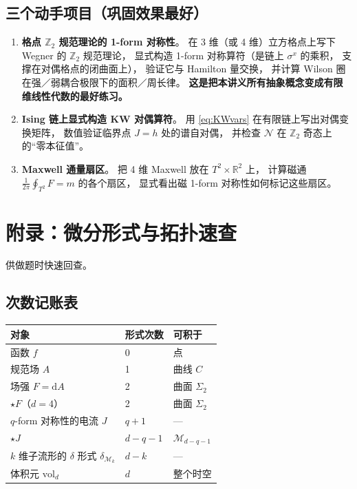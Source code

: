 \documentclass[UTF8,a4paper,11pt]{ctexart}
\theoremstyle{plain}
\theoremstyle{definition}
\theoremstyle{remark}
\newcommand{\ext}{\mathrm{d}}          %
\newcommand{\hs}{\star}                %
\newcommand{\Vol}{\mathrm{vol}}
\newcommand{\ZZ}{\mathbb{Z}}
\newcommand{\RR}{\mathbb{R}}
\newcommand{\Mfd}{\mathcal{M}}
\newcommand{\Ssurf}{\Sigma}
\begin{document}
\subsection{三个动手项目（巩固效果最好）}

\begin{enumerate}[label=\textbf{项目 \arabic*.},leftmargin=1.9cm]
  \item \textbf{格点 $\ZZ_2$ 规范理论的 1-form 对称性}。
        在 3 维（或 4 维）立方格点上写下 Wegner 的 $\ZZ_2$ 规范理论，
        显式构造 1-form 对称算符（是链上 $\sigma^x$ 的乘积，
        支撑在对偶格点的闭曲面上），
        验证它与 Hamilton 量交换，
        并计算 Wilson 圈在强／弱耦合极限下的面积／周长律。
        \textbf{这是把本讲义所有抽象概念变成有限维线性代数的最好练习。}
  \item \textbf{Ising 链上显式构造 KW 对偶算符}。
        用 \eqref{eq:KWvars} 在有限链上写出对偶变换矩阵，
        数值验证临界点 $J=h$ 处的谱自对偶，
        并检查 $\mathcal N$ 在 $\ZZ_2$ 奇态上的“零本征值”。
  \item \textbf{Maxwell 通量扇区}。
        把 4 维 Maxwell 放在 $T^2\times\RR^2$ 上，
        计算磁通 $\frac{1}{2\pi}\oint_{T^2}F=m$ 的各个扇区，
        显式看出磁 1-form 对称性如何标记这些扇区。
\end{enumerate}

\appendix

\section{附录：微分形式与拓扑速查}
\label{app:forms}

供做题时快速回查。

\subsection{次数记账表}

\begin{center}
\begin{tabular}{@{}lll@{}}
\toprule
对象 & 形式次数 & 可积于 \\
\midrule
函数 $f$ & 0 & 点 \\
规范场 $A$ & 1 & 曲线 $C$ \\
场强 $F=\ext A$ & 2 & 曲面 $\Ssurf_2$ \\
$\hs F$（$d=4$） & 2 & 曲面 $\Ssurf_2$ \\
$q$-form 对称性的电流 $J$ & $q+1$ & --- \\
$\hs J$ & $d-q-1$ & $\Mfd_{d-q-1}$ \\
$k$ 维子流形的 $\delta$ 形式 $\delta_{\Mfd_k}$ & $d-k$ & --- \\
体积元 $\Vol_d$ & $d$ & 整个时空 \\
\bottomrule
\end{tabular}
\end{center}
\end{document}
